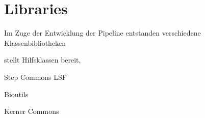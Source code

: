 \section{Libraries}
Im Zuge der Entwicklung der Pipeline entstanden verschiedene
Klassenbibliotheken

\begin{description}
  \item[Step Commons]
  stellt Hilfsklassen bereit, 
  \item Step Commons LSF
  \item Bioutils
  \item Kerner Commons
\end{description}